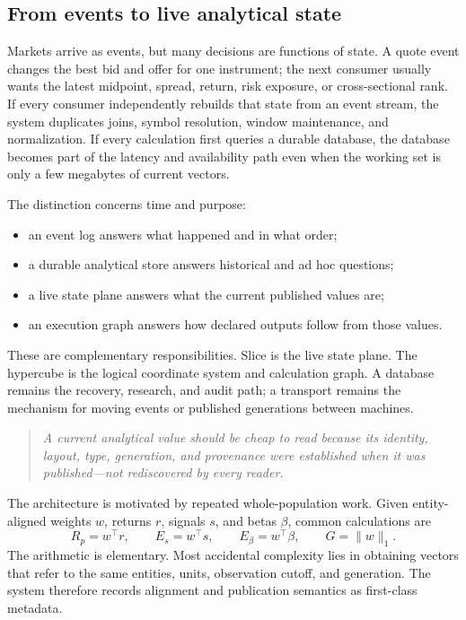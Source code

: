 \documentclass{strategynet-journal}
\newcommand{\SLICE}{\textsf{Slice}}
\begin{document}
\begin{SNcolumns}

\section{From events to live analytical state}

Markets arrive as events, but many decisions are functions of state.  A quote
event changes the best bid and offer for one instrument; the next consumer
usually wants the latest midpoint, spread, return, risk exposure, or
cross-sectional rank.  If every consumer independently rebuilds that state
from an event stream, the system duplicates joins, symbol resolution, window
maintenance, and normalization.  If every calculation first queries a durable
database, the database becomes part of the latency and availability path even
when the working set is only a few megabytes of current vectors.

The distinction concerns time and purpose:
\begin{itemize}
  \item an event log answers what happened and in what order;
  \item a durable analytical store answers historical and ad hoc questions;
  \item a live state plane answers what the current published values are;
  \item an execution graph answers how declared outputs follow from those
        values.
\end{itemize}
These are complementary responsibilities.  \SLICE{} is the live state plane.
The hypercube is the logical coordinate system and calculation graph.  A
database remains the recovery, research, and audit path; a transport remains
the mechanism for moving events or published generations between machines.

\begin{quote}
\itshape
A current analytical value should be cheap to read because its identity,
layout, type, generation, and provenance were established when it was
published---not rediscovered by every reader.
\end{quote}

The architecture is motivated by repeated whole-population work.  Given
entity-aligned weights \(w\), returns \(r\), signals \(s\), and betas
\(\beta\), common calculations are
\[
  R_p=w^\top r,\qquad
  E_s=w^\top s,\qquad
  E_\beta=w^\top\beta,\qquad
  G=\lVert w\rVert_1.
\]
The arithmetic is elementary.  Most accidental complexity lies in obtaining
vectors that refer to the same entities, units, observation cutoff, and
generation.  The system therefore records alignment and publication semantics
as first-class metadata.


\end{SNcolumns}
\end{document}
